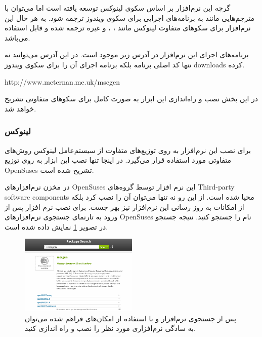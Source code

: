 گرچه این نرم‌افزار بر اساس سکوی لینوکس توسعه یافته است اما می‌توان با مترجم‌هایی
مانند  به برنامه‌های اجرایی برای سکوی ویندوز ترجمه شود. به هر حال این
نرم‌افزار برای سکو‌های متفاوت لینوکس مانند ، ،
 و غیره ترجمه شده و قابل استفاده می‌باشد.

\begin{webreference}
برنامه‌های اجرای این نرم‌افزار در آدرس زیر موجود است. در این آدرس می‌توانید نه
تنها کد اصلی برنامه بلکه برنامه اجرای آن را برای سکوی ویندوز \glspl{download}
کرده.

\begin{latin}
http://www.mcternan.me.uk/mscgen
\end{latin}
\end{webreference}

در این بخش نصب و راه‌اندازی این ابزار به صورت کامل برای سکوهای متفاوتی تشریح
خواهد شد.


\subsubsection{لینوکس}

برای نصب این نرم‌افزار به روی توزیع‌های متفاوت از سیستم‌عامل لینوکس روش‌های
متفاوتی مورد استفاده قرار می‌گیرد. در اینجا تنها نصب این ابزار به روی توزیع
\glspl{OpenSuse} تشریح شده است.

در مخزن نرم‌افزارهای \glspl{OpenSuse} این نرم افزار توسط گروه‌های 
\glspl{Third-party software component} محیا شده است. از این رو نه تنها می‌توان آن را نصب کرد بلکه
از امکانات به روز رسانی این نرم‌افزار نیز بهر جست. برای نصب نرم افزار پس از ورود
به تارنمای جستجوی نرم‌افزارهای \glspl{OpenSuse} نام  را جستجو کنید.
نتیجه جستجو در تصویر \ref{images/write/graph/mscgen/install-OpenSuse-1} نمایش
داده شده است.

\begin{figure}
	\centering
	\includegraphics[width=0.5\textwidth]{images/write/graph/mscgen/install-OpenSuse-1}
	\caption[جستجوی نرم‌افزار  در موتور جستجوی ]{
		پس از جستجوی نرم‌افزار  و با استفاده از امکان‌های فراهم شده می‌توان
		به سادگی نرم‌افزاری مورد نظر را نصب و راه اندازی کنید.
	}
	\label{images/write/graph/mscgen/install-OpenSuse-1}
\end{figure}

